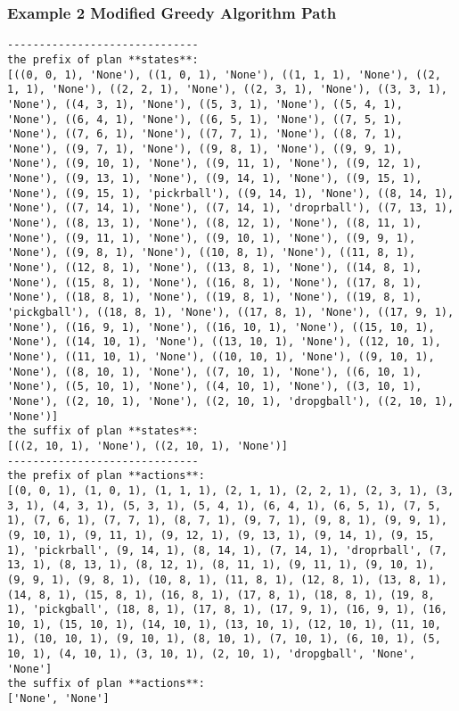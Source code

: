 \subsubsection{Example 2 Modified Greedy Algorithm Path}
\begin{lstlisting}
------------------------------
the prefix of plan **states**:
[((0, 0, 1), 'None'), ((1, 0, 1), 'None'), ((1, 1, 1), 'None'), ((2, 1, 1), 'None'), ((2, 2, 1), 'None'), ((2, 3, 1), 'None'), ((3, 3, 1), 'None'), ((4, 3, 1), 'None'), ((5, 3, 1), 'None'), ((5, 4, 1), 'None'), ((6, 4, 1), 'None'), ((6, 5, 1), 'None'), ((7, 5, 1), 'None'), ((7, 6, 1), 'None'), ((7, 7, 1), 'None'), ((8, 7, 1), 'None'), ((9, 7, 1), 'None'), ((9, 8, 1), 'None'), ((9, 9, 1), 'None'), ((9, 10, 1), 'None'), ((9, 11, 1), 'None'), ((9, 12, 1), 'None'), ((9, 13, 1), 'None'), ((9, 14, 1), 'None'), ((9, 15, 1), 'None'), ((9, 15, 1), 'pickrball'), ((9, 14, 1), 'None'), ((8, 14, 1), 'None'), ((7, 14, 1), 'None'), ((7, 14, 1), 'droprball'), ((7, 13, 1), 'None'), ((8, 13, 1), 'None'), ((8, 12, 1), 'None'), ((8, 11, 1), 'None'), ((9, 11, 1), 'None'), ((9, 10, 1), 'None'), ((9, 9, 1), 'None'), ((9, 8, 1), 'None'), ((10, 8, 1), 'None'), ((11, 8, 1), 'None'), ((12, 8, 1), 'None'), ((13, 8, 1), 'None'), ((14, 8, 1), 'None'), ((15, 8, 1), 'None'), ((16, 8, 1), 'None'), ((17, 8, 1), 'None'), ((18, 8, 1), 'None'), ((19, 8, 1), 'None'), ((19, 8, 1), 'pickgball'), ((18, 8, 1), 'None'), ((17, 8, 1), 'None'), ((17, 9, 1), 'None'), ((16, 9, 1), 'None'), ((16, 10, 1), 'None'), ((15, 10, 1), 'None'), ((14, 10, 1), 'None'), ((13, 10, 1), 'None'), ((12, 10, 1), 'None'), ((11, 10, 1), 'None'), ((10, 10, 1), 'None'), ((9, 10, 1), 'None'), ((8, 10, 1), 'None'), ((7, 10, 1), 'None'), ((6, 10, 1), 'None'), ((5, 10, 1), 'None'), ((4, 10, 1), 'None'), ((3, 10, 1), 'None'), ((2, 10, 1), 'None'), ((2, 10, 1), 'dropgball'), ((2, 10, 1), 'None')]
the suffix of plan **states**:
[((2, 10, 1), 'None'), ((2, 10, 1), 'None')]
------------------------------
the prefix of plan **actions**:
[(0, 0, 1), (1, 0, 1), (1, 1, 1), (2, 1, 1), (2, 2, 1), (2, 3, 1), (3, 3, 1), (4, 3, 1), (5, 3, 1), (5, 4, 1), (6, 4, 1), (6, 5, 1), (7, 5, 1), (7, 6, 1), (7, 7, 1), (8, 7, 1), (9, 7, 1), (9, 8, 1), (9, 9, 1), (9, 10, 1), (9, 11, 1), (9, 12, 1), (9, 13, 1), (9, 14, 1), (9, 15, 1), 'pickrball', (9, 14, 1), (8, 14, 1), (7, 14, 1), 'droprball', (7, 13, 1), (8, 13, 1), (8, 12, 1), (8, 11, 1), (9, 11, 1), (9, 10, 1), (9, 9, 1), (9, 8, 1), (10, 8, 1), (11, 8, 1), (12, 8, 1), (13, 8, 1), (14, 8, 1), (15, 8, 1), (16, 8, 1), (17, 8, 1), (18, 8, 1), (19, 8, 1), 'pickgball', (18, 8, 1), (17, 8, 1), (17, 9, 1), (16, 9, 1), (16, 10, 1), (15, 10, 1), (14, 10, 1), (13, 10, 1), (12, 10, 1), (11, 10, 1), (10, 10, 1), (9, 10, 1), (8, 10, 1), (7, 10, 1), (6, 10, 1), (5, 10, 1), (4, 10, 1), (3, 10, 1), (2, 10, 1), 'dropgball', 'None', 'None']
the suffix of plan **actions**:
['None', 'None']
\end{lstlisting}

\endgroup